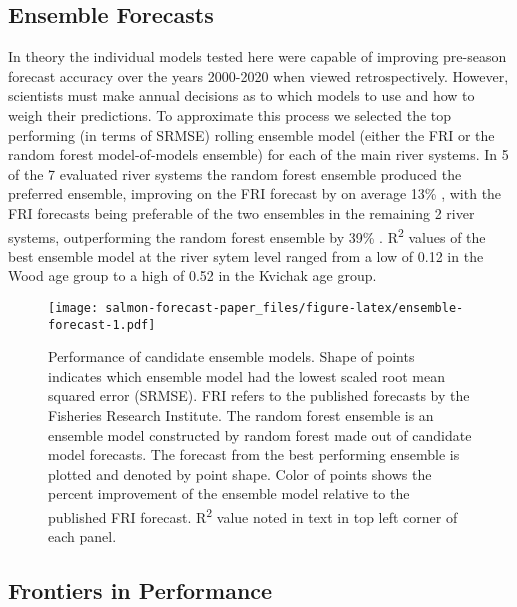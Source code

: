 \documentclass[
]{article}
\begin{document}
\hypertarget{ensemble-forecasts}{%
\subsection{Ensemble Forecasts}\label{ensemble-forecasts}}

In theory the individual models tested here were capable of improving pre-season forecast accuracy over the years 2000-2020 when viewed retrospectively. However, scientists must make annual decisions as to which models to use and how to weigh their predictions. To approximate this process we selected the top performing (in terms of SRMSE) rolling ensemble model (either the FRI or the random forest model-of-models ensemble) for each of the main river systems. In 5 of the 7 evaluated river systems the random forest ensemble produced the preferred ensemble, improving on the FRI forecast by on average 13\% , with the FRI forecasts being preferable of the two ensembles in the remaining 2 river systems, outperforming the random forest ensemble by 39\% . R\textsuperscript{2} values of the best ensemble model at the river sytem level ranged from a low of 0.12 in the Wood age group to a high of 0.52 in the Kvichak age group.

\begin{figure}
\centering
\texttt{[image: salmon-forecast-paper\_files/figure-latex/ensemble-forecast-1.pdf]}
\caption{\label{fig:ensemble-forecast}Performance of candidate ensemble models. Shape of points indicates which ensemble model had the lowest scaled root mean squared error (SRMSE). FRI refers to the published forecasts by the Fisheries Research Institute. The random forest ensemble is an ensemble model constructed by random forest made out of candidate model forecasts. The forecast from the best performing ensemble is plotted and denoted by point shape. Color of points shows the percent improvement of the ensemble model relative to the published FRI forecast. R\textsuperscript{2} value noted in text in top left corner of each panel.}
\end{figure}

\hypertarget{frontiers-in-performance}{%
\subsection{Frontiers in Performance}\label{frontiers-in-performance}}
\end{document}

